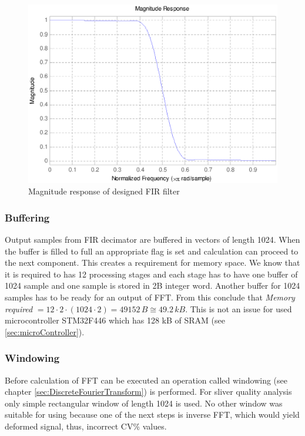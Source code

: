\documentclass[twoside]{ctuthesis}
\theoremstyle{plain}
\theoremstyle{definition}
\theoremstyle{note}
\begin{document}
\begin{figure}[h]
	\centering
	\includegraphics[width=1.0\textwidth]{magnitudeResponse.eps}
	\caption{Magnitude response of designed FIR filter}
	\label{fig:MagnitudeResponse}
\end{figure}

\subsubsection{Buffering}
Output samples from FIR decimator are buffered in vectors of length 1024. When the buffer is filled to full an appropriate flag is set and calculation can proceed to the next component. This creates a requirement for memory space. We know that it is required to has 12 processing stages and each stage has to have one buffer of 1024 sample and one sample is stored in 2B integer word. Another buffer for 1024 samples has to be ready for an output of FFT. From this conclude that \textit{Memory required} $= 12 \cdot 2 \cdot(1024 \cdot 2)=49152\,B\cong49.2\,kB$. This is not an issue for used microcontroller STM32F446 which has 128 kB of SRAM (see \ref{sec:microController}).

\subsubsection{Windowing}
Before calculation of FFT can be executed an operation called windowing (see chapter \ref{sec:DiscreteFourierTransform}) is performed. For sliver quality analysis only simple rectangular window of length 1024 is used. No other window was suitable for using because one of the next steps is inverse FFT, which would yield deformed signal, thus, incorrect CV\% values.
\end{document}
